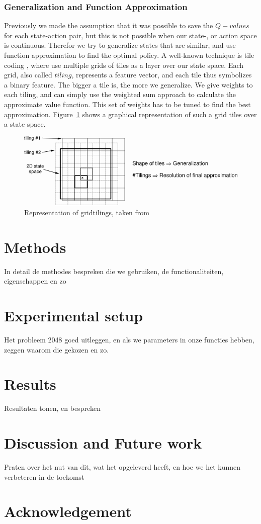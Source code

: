 \documentclass[a4paper,12pt]{article}
\begin{document}
\subsubsection{Generalization and Function Approximation}
Previously we made the assumption that it was possible to save the $Q-values$ for each state-action pair, but this is not possible when our state-, or action space is continuous. Therefor we try to generalize states that are similar, and use function approximation to find the optimal policy. A well-known technique is tile coding \cite{sutton1998rl}, where use multiple grids of tiles as a layer over our state space. Each grid, also called $tiling$, represents a feature vector, and each tile thus symbolizes a binary feature. The bigger a tile is, the more we generalize. We give weights to each tiling, and can simply use the weighted sum approach to calculate the approximate value function. This set of weights has to be tuned to find the best approximation. Figure~\ref{fig:figtmp54} shows a graphical representation of such a grid tiles over a state space.
\begin{figure}[b]
\centering
\includegraphics[width=\textwidth]{img/figtmp54}
\caption{Representation of gridtilings, taken from \cite{sutton1998rl}}
\label{fig:figtmp54}
\end{figure}
\section{Methods}
In detail de methodes bespreken die we gebruiken, de functionaliteiten, eigenschappen en zo
\section{Experimental setup}
Het probleem 2048 goed uitleggen, en als we parameters in onze functies hebben, zeggen waarom die gekozen en zo.
\section{Results}
Resultaten tonen, en bespreken
\section{Discussion and Future work}
Praten over het nut van dit, wat het opgeleverd heeft, en hoe we het kunnen verbeteren in de toekomst
\section{Acknowledgement}



\end{document}
